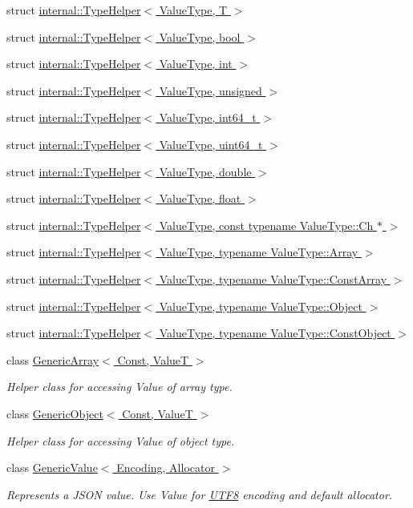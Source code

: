 \begin{DoxyCompactItemize}
struct \hyperlink{a02024}{internal\+::\+Type\+Helper$<$ Value\+Type, T $>$}
\item 
struct \hyperlink{a02028}{internal\+::\+Type\+Helper$<$ Value\+Type, bool $>$}
\item 
struct \hyperlink{a02032}{internal\+::\+Type\+Helper$<$ Value\+Type, int $>$}
\item 
struct \hyperlink{a02036}{internal\+::\+Type\+Helper$<$ Value\+Type, unsigned $>$}
\item 
struct \hyperlink{a02040}{internal\+::\+Type\+Helper$<$ Value\+Type, int64\+\_\+t $>$}
\item 
struct \hyperlink{a02044}{internal\+::\+Type\+Helper$<$ Value\+Type, uint64\+\_\+t $>$}
\item 
struct \hyperlink{a02048}{internal\+::\+Type\+Helper$<$ Value\+Type, double $>$}
\item 
struct \hyperlink{a02052}{internal\+::\+Type\+Helper$<$ Value\+Type, float $>$}
\item 
struct \hyperlink{a02056}{internal\+::\+Type\+Helper$<$ Value\+Type, const typename Value\+Type\+::\+Ch $\ast$ $>$}
\item 
struct \hyperlink{a02060}{internal\+::\+Type\+Helper$<$ Value\+Type, typename Value\+Type\+::\+Array $>$}
\item 
struct \hyperlink{a02064}{internal\+::\+Type\+Helper$<$ Value\+Type, typename Value\+Type\+::\+Const\+Array $>$}
\item 
struct \hyperlink{a02068}{internal\+::\+Type\+Helper$<$ Value\+Type, typename Value\+Type\+::\+Object $>$}
\item 
struct \hyperlink{a02072}{internal\+::\+Type\+Helper$<$ Value\+Type, typename Value\+Type\+::\+Const\+Object $>$}
\item 
class \hyperlink{a02076}{Generic\+Array$<$ Const, Value\+T $>$}
\begin{DoxyCompactList}\small\item\em Helper class for accessing Value of array type. \end{DoxyCompactList}\item 
class \hyperlink{a02080}{Generic\+Object$<$ Const, Value\+T $>$}
\begin{DoxyCompactList}\small\item\em Helper class for accessing Value of object type. \end{DoxyCompactList}\item 
class \hyperlink{a01992}{Generic\+Value$<$ Encoding, Allocator $>$}
\begin{DoxyCompactList}\small\item\em Represents a J\+S\+ON value. Use Value for \hyperlink{a02144}{U\+T\+F8} encoding and default allocator. \end{DoxyCompactList}\item 

\end{DoxyCompactItemize}
